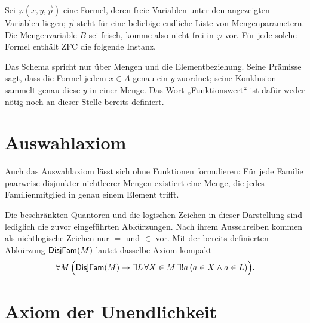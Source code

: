 \documentclass[main.tex]{subfiles}
\begin{document}
Sei \(\varphi(x,y,\vec p)\) eine Formel, deren freie Variablen unter den
angezeigten Variablen liegen; \(\vec p\) steht für eine beliebige endliche
Liste von Mengenparametern. Die Mengenvariable \(B\) sei frisch, komme also
nicht frei in \(\varphi\) vor. Für jede solche Formel enthält ZFC die folgende
Instanz.


Das Schema spricht nur über Mengen und die Elementbeziehung. Seine Prämisse
sagt, dass die Formel jedem \(x\in A\) genau ein \(y\) zuordnet; seine
Konklusion sammelt genau diese \(y\) in einer Menge. Das Wort
„Funktionswert“ ist dafür weder nötig noch an dieser Stelle bereits
definiert.

\section{Auswahlaxiom}

Auch das Auswahlaxiom lässt sich ohne Funktionen formulieren: Für jede
Familie paarweise disjunkter nichtleerer Mengen existiert eine Menge, die
jedes Familienmitglied in genau einem Element trifft.


Die beschränkten Quantoren und die logischen Zeichen in dieser Darstellung
sind lediglich die zuvor eingeführten Abkürzungen. Nach ihrem Ausschreiben
kommen als nichtlogische Zeichen nur \(=\) und \(\in\) vor. Mit der bereits
definierten Abkürzung \(\mathsf{DisjFam}(M)\) lautet dasselbe Axiom kompakt
\[
  \forall M\,\Bigl(
    \mathsf{DisjFam}(M)\rightarrow
    \exists L\,\forall X\in M\,\exists!a\,
    (a\in X\land a\in L)
  \Bigr).
\]

\section{Axiom der Unendlichkeit}

\end{document}
